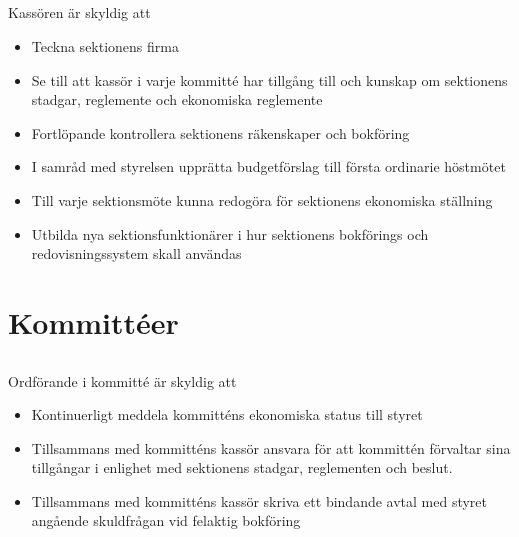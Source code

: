 \documentclass[a4paper, 10pt]{article}
\begin{document}
\subsection{}
Kassören är skyldig att
\begin{itemize}
  \item Teckna sektionens firma
  \item Se till att kassör i varje kommitté har tillgång till och kunskap om sektionens stadgar, reglemente och ekonomiska reglemente
  \item Fortlöpande kontrollera sektionens räkenskaper och bokföring
  \item I samråd med styrelsen upprätta budgetförslag till första ordinarie höstmötet
  \item Till varje sektionsmöte kunna redogöra för sektionens ekonomiska ställning
  \item Utbilda nya sektionsfunktionärer i hur sektionens bokförings och redovisningssystem skall användas
\end{itemize}

\section{Kommittéer}
\label{sec:kommitteer}

\subsection{}
Ordförande i kommitté är skyldig att
\begin{itemize}
\item Kontinuerligt meddela kommitténs ekonomiska status till styret
\item Tillsammans med kommitténs kassör ansvara för att kommittén förvaltar sina tillgångar i enlighet med sektionens stadgar, reglementen och beslut.
\item Tillsammans med kommitténs kassör skriva ett bindande avtal med styret angående skuldfrågan vid felaktig bokföring
\end{itemize}
\end{document}
